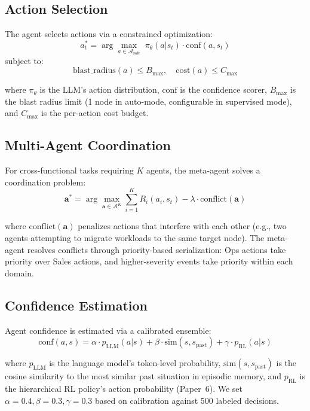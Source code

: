 \documentclass[conference,10pt,letterpaper]{IEEEtran}
\begin{document}
\subsection{Action Selection}

The agent selects actions via a constrained optimization:
\begin{equation}
a_t^* = \arg\max_{a \in \mathcal{A}_\text{safe}} \; \pi_\theta(a | s_t) \cdot \text{conf}(a, s_t)
\end{equation}
subject to:
\begin{equation}
\text{blast\_radius}(a) \leq B_{\max}, \quad \text{cost}(a) \leq C_{\max}
\end{equation}

where $\pi_\theta$ is the LLM's action distribution, $\text{conf}$ is the confidence scorer, $B_{\max}$ is the blast radius limit (1 node in auto-mode, configurable in supervised mode), and $C_{\max}$ is the per-action cost budget.

\subsection{Multi-Agent Coordination}

For cross-functional tasks requiring $K$ agents, the meta-agent solves a coordination problem:
\begin{equation}
\mathbf{a}^* = \arg\max_{\mathbf{a} \in \mathcal{A}^K} \sum_{i=1}^{K} R_i(a_i, s_t) - \lambda \cdot \text{conflict}(\mathbf{a})
\end{equation}

where $\text{conflict}(\mathbf{a})$ penalizes actions that interfere with each other (e.g., two agents attempting to migrate workloads to the same target node). The meta-agent resolves conflicts through priority-based serialization: Ops actions take priority over Sales actions, and higher-severity events take priority within each domain.

\subsection{Confidence Estimation}

Agent confidence is estimated via a calibrated ensemble:
\begin{equation}
\text{conf}(a, s) = \alpha \cdot p_{\text{LLM}}(a | s) + \beta \cdot \text{sim}(s, s_{\text{past}}) + \gamma \cdot p_{\text{RL}}(a | s)
\end{equation}

where $p_{\text{LLM}}$ is the language model's token-level probability, $\text{sim}(s, s_{\text{past}})$ is the cosine similarity to the most similar past situation in episodic memory, and $p_{\text{RL}}$ is the hierarchical RL policy's action probability (Paper~6). We set $\alpha{=}0.4, \beta{=}0.3, \gamma{=}0.3$ based on calibration against 500 labeled decisions.
\end{document}
